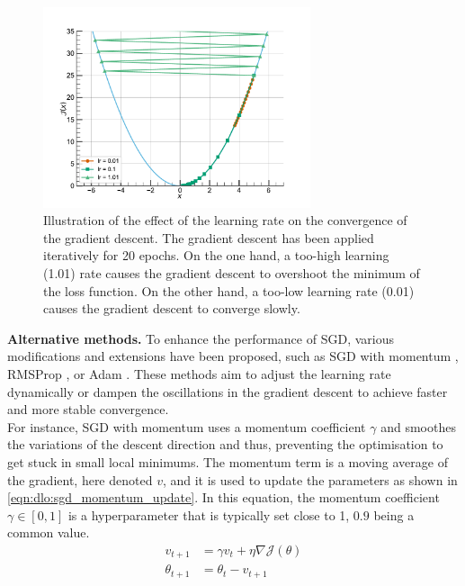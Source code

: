 \begin{figure}[htbp]
  \centering
  \includegraphics[width=0.7\textwidth]{chapter_dlo/assets/gradient_descent.pdf}
  \caption{Illustration of the effect of the learning rate on the convergence of
    the gradient descent. The gradient descent has been applied iteratively for
    20 epochs. On the one hand, a too-high learning (1.01) rate causes the
    gradient descent to overshoot the minimum of the loss function. On the other
    hand, a too-low learning rate (0.01) causes the gradient descent to converge
    slowly.}
  \label{fig:dlo:gradient_descent}
\end{figure}

\noindent \textbf{Alternative methods.} To enhance the performance of \ac{SGD},
various modifications and extensions have been proposed, such as \ac{SGD} with
momentum \cite{sutskever2013importance,polyak1964some}, RMSProp
\cite{hinton2012neural}, or Adam \cite{kingma2014adam}. These methods aim to
adjust the learning rate dynamically or dampen the oscillations in the gradient
descent to achieve faster and more stable convergence.\\

For instance, \ac{SGD} with momentum
\cite{sutskever2013importance,polyak1964some} uses a momentum coefficient
$\gamma$ and smoothes the variations of the descent direction and thus,
preventing the optimisation to get stuck in small local minimums. The momentum
term is a moving average of the gradient, here denoted $v$, and it is used to
update the parameters as shown in \cref{eqn:dlo:sgd_momentum_update}. In this
equation, the momentum coefficient $\gamma \in [0,1]$ is a hyperparameter that
is typically set close to 1, $0.9$ being a common value.\\

\begin{equation}
  \label{eqn:dlo:sgd_momentum_update}
  \begin{split}
    v_{t+1} &= \gamma v_t + \eta \nabla \mathcal{J}(\theta) \\
    \theta_{t+1} &= \theta_t - v_{t+1}
  \end{split}
\end{equation}\\

